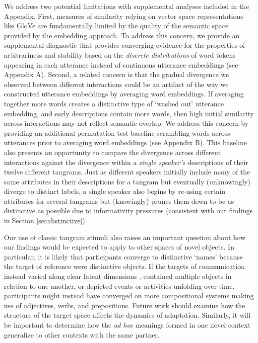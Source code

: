 \documentclass[alpha-refs]{wiley-article}
\begin{document}
We address two potential limitations with supplemental analyses included in the Appendix.
First, measures of similarity relying on vector space representations like GloVe are fundamentally limited by the quality of the semantic space provided by the embedding approach.
To address this concern, we provide an supplemental diagnostic that provides converging evidence for the properties of arbitrariness and stability based on the \emph{discrete distributions} of word tokens appearing in each utterance instead of continuous utterance embeddings (see Appendix A).
Second, a related concern is that the gradual divergence we observed between different interactions could be an artifact of the way we constructed utterance embeddings by averaging word embeddings. 
If averaging together more words creates a distinctive type of `washed out' utterance embedding, and early descriptions contain more words, then high initial similarity across interactions may not reflect semantic overlap. 
We address this concern by providing an additional permutation test baseline scrambling words across utterances prior to averaging word embeddings (see Appendix B).
This baseline also presents an opportunity to compare the divergence across different interactions against the divergence within a \emph{single speaker's} descriptions of their twelve different tangrams.
Just as different speakers initially include many of the same attributes in their descriptions for a tangram but eventually (unknowingly) diverge to distinct labels, a single speaker also begins by re-using certain attributes for several tangrams but (knowingly) prunes them down to be as distinctive as possible due to informativity pressures (consistent with our findings in Section \ref{sec:distinctive}).


Our use of classic tangram stimuli also raises an important question about how our findings would be expected to apply to other spaces of novel objects. 
In particular, it is likely that participants converge to distinctive `names' because the target of reference were distinctive objects.
If the targets of communication instead varied along clear latent dimensions \citep[e.g.][]{nolle2018emergence}, contained multiple objects in relation to one another, or depicted events or activities unfolding over time, participants might instead have converged on more compositional systems making use of adjectives, verbs, and prepositions.
Future work should examine how the structure of the target space affects the dynamics of adaptation. 
Similarly, it will be important to determine how the \emph{ad hoc} meanings formed in one novel context generalize to other contexts with the same partner.
\end{document}

